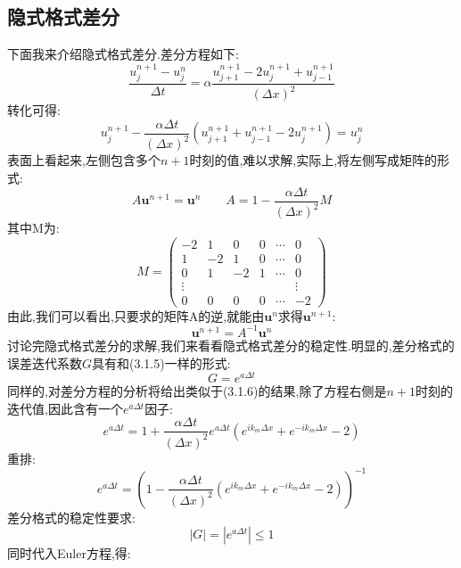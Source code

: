 \documentclass{article}
\numberwithin{equation}{subsection}
\begin{document}
\subsection{隐式格式差分}
下面我来介绍隐式格式差分.差分方程如下:
\begin{equation}
     \frac{u^{n+1}_j - u^n_j}{\Delta t} = \alpha\frac{u^{n+1}_{j+1}-2u^{n+1}_j + u^{n+1}_{j-1}}{(\Delta x)^2}
\end{equation}
转化可得:
\begin{equation}
    u^{n+1}_j - \frac{\alpha\Delta t}{(\Delta x)^2}(u^{n+1}_{j+1}+u^{n+1}_{j-1}-2u^{n+1}_j) = u^n_j
\end{equation}
表面上看起来,左侧包含多个$n+1$时刻的值,难以求解,实际上,将左侧写成矩阵的形式:
\begin{equation}
A\textbf{u}^{n+1} = \textbf{u}^n\qquad A = 1-\frac{\alpha\Delta t}{(\Delta x)^2}M
\end{equation}
其中M为:
$$M = \begin{pmatrix}
-2&1&0&0&\cdots&0\\
1&-2&1&0&\cdots&0\\
0&1&-2&1&\cdots&0\\
\vdots& & & & &\vdots\\
0&0&0&0&\cdots&-2
\end{pmatrix}$$
由此,我们可以看出,只要求的矩阵A的逆,就能由$\textbf{u}^n$求得$\textbf{u}^{n+1}$:
\begin{equation}
    \mathbf{u}^{n+1} = A^{-1}\mathbf{u}^n
\end{equation}
讨论完隐式格式差分的求解,我们来看看隐式格式差分的稳定性.明显的,差分格式的误差迭代系数$G$具有和(3.1.5)一样的形式:
\begin{equation}
    G = e^{a\Delta t}
\end{equation}
同样的,对差分方程的分析将给出类似于(3.1.6)的结果,除了方程右侧是$n+1$时刻的迭代值,因此含有一个$e^{a\Delta t}$因子:
\begin{equation}
    e^{a\Delta t} = 1+\frac{\alpha \Delta t}{(\Delta x)^2}e^{a\Delta t}\left(e^{i k_{m} \Delta x}+e^{-i k_{m} \Delta x}-2\right)
\end{equation}
重排:
\begin{equation}
    e^{a\Delta t} = \left(1-\frac{\alpha\Delta t}{(\Delta x)^2}\left(e^{i k_{m} \Delta x}+e^{-i k_{m} \Delta x}-2\right)\right)^{-1}
\end{equation}
差分格式的稳定性要求:
\begin{equation}
    |G| = |e^{a\Delta t}|\leq 1
\end{equation}
同时代入Euler方程,得:
\end{document}
